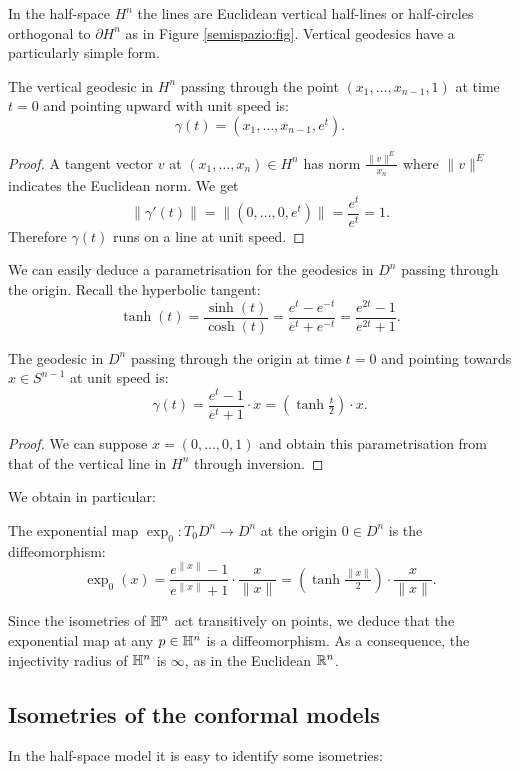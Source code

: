In the half-space $H^n$ the lines are Euclidean vertical half-lines or half-circles orthogonal to $\partial H^n$ as in Figure \ref{semispazio:fig}. Vertical geodesics have a particularly simple form.
\begin{prop} \label{verticale:prop}
The vertical geodesic in $H^n$ passing through the point $(x_1,\ldots,x_{n-1},1)$ at time $t=0$ and pointing upward with unit speed is:
$$\gamma(t) = (x_1,\ldots,x_{n-1},e^t).$$
\end{prop}
\begin{proof}
A tangent vector $v$ at $(x_1,\ldots,x_n) \in H^n$ has norm $\frac{\|v\|^E}{x_n}$ where $\|v\|^E$ indicates the Euclidean norm. We get 
$$\|\gamma'(t)\| = \|(0,\ldots,0,e^t)\| = \frac {e^t}{e^t} = 1.$$
Therefore $\gamma(t)$ runs on a line at unit speed.
\end{proof}
We can easily deduce a parametrisation for the geodesics in $D^n$ passing through the origin. Recall the hyperbolic tangent:
$$\tanh (t) = \frac {\sinh (t)}{\cosh (t)} = \frac{e^t-e^{-t}}{e^t+e^{-t}} = \frac{e^{2t} -1}{e^{2t}+1}.$$
\begin{prop}
The geodesic in $D^n$ passing through the origin at time $t=0$ and pointing towards $x \in S^{n-1}$ at unit speed is:
$$\gamma(t) = \frac{e^{t}-1}{e^{t}+1}\cdot x = \left(\tanh \tfrac {t}2\right)\cdot x.$$
\end{prop}
\begin{proof}
We can suppose $x=(0,\ldots,0,1)$ and obtain this parametrisation from that of the vertical line in $H^n$ through inversion.
\end{proof}

We obtain in particular:
\begin{cor} \label{exp:cor}
The exponential map $\exp_0\colon T_0D^n \to D^n$ at the origin $0 \in D^n$ is the diffeomorphism:
$$\exp_0(x) = \frac{e^{\|x\|}-1}{e^{\|x\|}+1}\cdot \frac{x}{\|x\|} = \left(\tanh\tfrac{\|x\|}2 \right)\cdot \frac x{\|x\|}.$$
\end{cor}

Since the isometries of $\mathbb{H}^n$ act transitively on points, we deduce that the exponential map at any $p\in \mathbb{H}^n$ is a diffeomorphism. As a consequence, the injectivity radius of $\mathbb{H}^n$ is $\infty$, as in the Euclidean $\mathbb{R}^n$.

\subsection{Isometries of the conformal models}
In the half-space model it is easy to identify some isometries:

